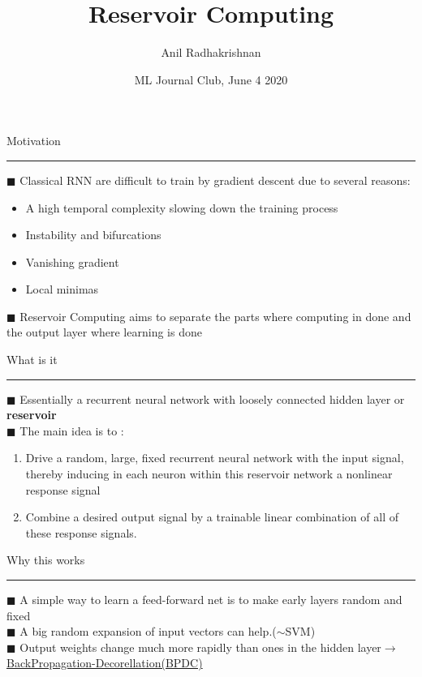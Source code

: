 \documentclass[c,compress]{beamer}
\title{Reservoir Computing}
\author{Anil Radhakrishnan}
\institute{University of Illinois}
\date{ML Journal Club, June 4 2020 }
\def\bsq{\color{blue(pigment)} $\blacksquare$ \color{black}}
\begin{document}
\frame{\titlepage}

\begin{frame}{Motivation\\\rule{10.5cm}{0.5pt}} \label{Motiv}
\bsq Classical RNN are difficult to train by gradient descent due to several reasons:
\begin{itemize}
    \item A high temporal complexity slowing down the training process
    \item Instability and bifurcations
    \item Vanishing gradient
    \item Local minimas
\end{itemize}
\bsq Reservoir Computing aims to separate the parts where computing in done and the output layer where learning is done

\end{frame} 
\begin{frame}{What is it\\\rule{10.5cm}{0.5pt}} \label{def}
\bsq Essentially a recurrent neural network with loosely connected hidden layer or \textbf{reservoir}\\
\bsq The main idea is to :
\begin{enumerate}
    \item Drive a random, large, fixed recurrent neural network with the input signal, thereby inducing in each neuron within this reservoir network a nonlinear response signal
    \item Combine a desired output signal by a trainable linear combination of all of these response signals. 
\end{enumerate}

\end{frame}

\begin{frame}{Why this works\\\rule{10.5cm}{0.5pt}} \label{keys}
\bsq A simple way to learn a feed-forward net is to make early layers random and fixed\\
\bsq A big random expansion of input vectors can help.($\sim$SVM)\\
\bsq Output weights change much more rapidly than ones in the hidden layer$\rightarrow$ \href{http://citeseerx.ist.psu.edu/viewdoc/download?doi=10.1.1.161.9279&rep=rep1&type=pdf}{BackPropagation-Decorellation(BPDC)}

\end{frame} 
\end{document}
